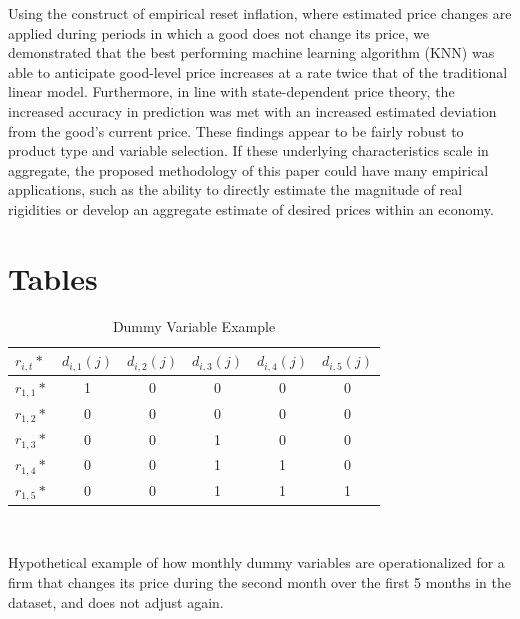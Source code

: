 \documentclass[11pt]{article}
\begin{document}
Using the construct of empirical reset inflation, where estimated price changes are applied during periods in which a good does not change its price, we demonstrated that the best performing machine learning algorithm (KNN) was able to anticipate good-level price increases at a rate twice that of the traditional linear model. Furthermore, in line with state-dependent price theory, the increased accuracy in prediction was met with an increased estimated deviation from the good's current price. These findings appear to be fairly robust to product type and variable selection. If these underlying characteristics scale in aggregate, the proposed methodology of this paper could have many empirical applications, such as the ability to directly estimate the magnitude of real rigidities or develop an aggregate estimate of desired prices within an economy.


\nocite{*}
\printbibliography


\pagebreak
\section{Tables}


\begin{table}[ht]
    \centering
        \caption{Dummy Variable Example}
    \begin{tabular}{l | c  c  c  c c } 
 \hline
  $r_{i,t}*$ & $d_{i,1}(j)$ & $d_{i,2}(j)$  & $d_{i,3}(j)$  & $d_{i,4}(j)$  & $d_{i,5}(j)$ \\ [0.5ex] 
 \hline\hline
 $r_{1,1}*$ & 1 & 0 & 0 & 0 & 0 \\
  $r_{1,2}*$ & 0 & 0 & 0 & 0 & 0  \\
  $r_{1,3}*$ & 0 & 0 & 1 & 0 & 0  \\
   $r_{1,4}*$ & 0 & 0 & 1 & 1 & 0  \\
   $r_{1,5}*$ & 0 & 0 & 1 & 1 & 1  \\
  \hline
\end{tabular}
\vspace{1mm}
\\
\begin{tablenotes}\footnotesize
\item Hypothetical example of how monthly dummy variables are operationalized for a firm that changes its price during the second month over the first 5 months in the dataset, and does not adjust again. 
\end{tablenotes}
\label{Table 1}
\end{table}

\vspace{20mm}
\end{document}
